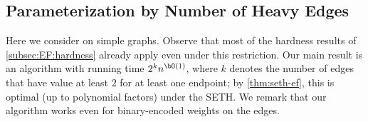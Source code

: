 \documentclass[11pt,letterpaper]{article}
\begin{document}

\subsection{Parameterization by Number of Heavy Edges}\label{subsec:EFo_heavy}

Here we consider {\EFo} on simple graphs.
Observe that most of the hardness results of \cref{subsec:EF:hardness} already apply even under this restriction.
Our main result is an algorithm with running time $2^k n^{\bO(1)}$,
where $k$ denotes the number of edges that have value at least $2$ for at least one endpoint;
by \cref{thm:seth-ef}, this is optimal (up to polynomial factors) under the SETH.
We remark that our algorithm works even for binary-encoded weights on the edges.
\end{document}
